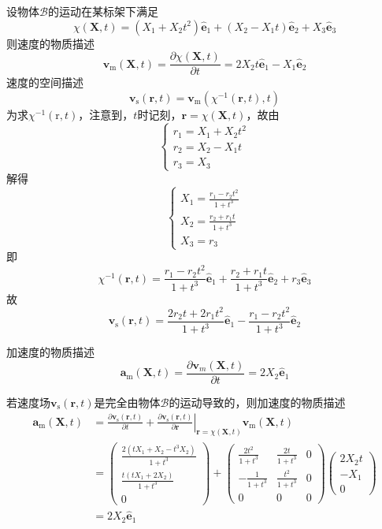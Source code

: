 \documentclass[main.tex]{subfiles}
\begin{document}
\begin{example}
设物体$\mathcal{B}$的运动在某标架下满足
\[
\chi\left(\mathbf{X},t\right)=\left(X_1+X_2 t^2\right)\mathbf{\hat{e}}_1+\left(X_2-X_1t\right)\mathbf{\hat{e}}_2+X_3\mathbf{\hat{e}}_3
\]
则速度的物质描述
\[\mathbf{v}_\mathrm{m}\left(\mathbf{X},t\right)=\frac{\partial\chi\left(\mathbf{X},t\right)}{\partial t}=2X_2t\mathbf{\hat{e}}_1-X_1\mathbf{\hat{e}}_2\]
速度的空间描述
\[\mathbf{v}_\mathrm{s}\left(\mathbf{r},t\right)=\mathbf{v}_\mathrm{m}\left(\chi^{-1}\left(\mathbf{r},t\right),t\right)\]
为求$\chi^{-1}\left(\mathrm{r},t\right)$，注意到，$t$时记刻，$\mathbf{r}=\chi\left(\mathbf{X},t\right)$，故由
\[\left\{\begin{array}{l}r_1=X_1+X_2t^2\\r_2=X_2-X_1t\\r_3=X_3\end{array}\right.\]
解得
\[\left\{\begin{array}{l}X_1=\frac{r_1-r_2t^2}{1+t^3}\\X_2=\frac{r_2+r_1t}{1+t^3}\\X_3=r_3\end{array}\right.\]
即
\[\chi^{-1}\left(\mathbf{r},t\right)=\frac{r_1-r_2t^2}{1+t^3}\mathbf{\hat{e}}_1+\frac{r_2+r_1t}{1+t^3}\mathbf{\hat{e}}_2+r_3\mathbf{\hat{e}}_3\]
故
\[\mathbf{v}_\mathrm{s}\left(\mathbf{r},t\right)=\frac{2r_2t+2r_1t^2}{1+t^3}\mathbf{\hat{e}}_1-\frac{r_1-r_2t^2}{1+t^3}\mathbf{\hat{e}}_2\]

加速度的物质描述
\[\mathbf{a}_\mathrm{m}\left(\mathbf{X},t\right)=\frac{\partial \mathbf{v}_m\left(\mathbf{X},t\right)}{\partial t}=2X_2\mathbf{\hat{e}}_1\]

若速度场$\mathbf{v}_\mathrm{s}\left(\mathbf{r},t\right)$是完全由物体$\mathcal{B}$的运动导致的，则加速度的物质描述
\begin{align*}
\mathbf{a}_\mathrm{m}\left(\mathbf{X},t\right)&=\frac{\partial\mathbf{v}_\mathrm{s}\left(\mathbf{r},t\right)}{\partial t}+\left.\frac{\partial \mathbf{v}_\mathrm{s}\left(\mathbf{r},t\right)}{\partial\mathbf{r}}\right|_{
\mathbf{r}=\chi\left(\mathbf{X},t\right)}\mathbf{v}_\mathrm{m}\left(\mathbf{X},t\right)\\
&=\left(\begin{array}{c}\frac{2\left(t X_1+X_2-t^3 X_2\right)}{1+t^3}\\\frac{t\left(t X_1+2 X_2\right)}{1+t^3}\\0\end{array}\right)+\left(\begin{array}{ccc}\frac{2t^2}{1+t^3}&\frac{2t}{1+t^3}&0\\-\frac{1}{1+t^3}&\frac{t^2}{1+t^3}&0\\0&0&0\end{array}\right)\left(\begin{array}{c}2X_2t\\-X_1\\0\end{array}\right)\\
&=2X_2\mathbf{\hat{e}}_1
\end{align*}
\end{example}
\end{document}
